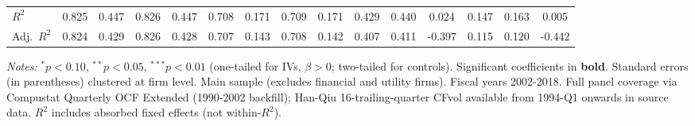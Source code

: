 \begin{landscape}
\begin{table}[H]
\begin{tabular}{lcccccccccccccc}
$R^2$ & 0.825 & 0.447 & 0.826 & 0.447 & 0.708 & 0.171 & 0.709 & 0.171 & 0.429 & 0.440 & 0.024 & 0.147 & 0.163 & 0.005 \\
Adj.~$R^2$ & 0.824 & 0.429 & 0.826 & 0.428 & 0.707 & 0.143 & 0.708 & 0.142 & 0.407 & 0.411 & -0.397 & 0.115 & 0.120 & -0.442 \\
\bottomrule
\end{tabular}
\begin{minipage}{\linewidth}
\vspace{2pt}\scriptsize
\textit{Notes:} $^{*}p<0.10$, $^{**}p<0.05$, $^{***}p<0.01$ (one-tailed for IVs, $\beta > 0$; two-tailed for controls).
 Significant coefficients in \textbf{bold}.
 Standard errors (in parentheses) clustered at firm level.
 Main sample (excludes financial and utility firms). Fiscal years 2002-2018. Full panel coverage via Compustat Quarterly OCF Extended (1990-2002 backfill); Han-Qiu 16-trailing-quarter CFvol available from 1994-Q1 onwards in source data.
 $R^2$ includes absorbed fixed effects (not within-$R^2$).
\end{minipage}
\end{table}
\end{landscape}